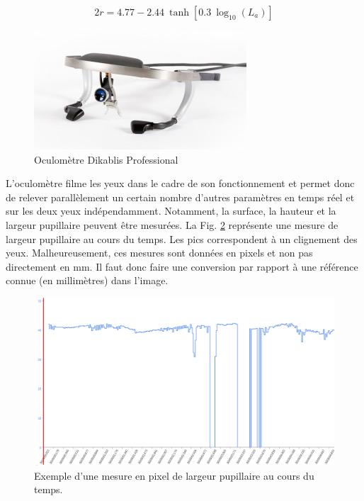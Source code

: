 	\begin{equation}
		2r = 4.77 - 2.44~\tanh[0.3~\log_{10}(L_a)]
		\label{eq:weale_equation}
	\end{equation}
	
	\begin{figure}
		\centering
		\includegraphics[scale=1]{Figures/DikablisProfessional}
		\caption{Oculomètre Dikablis Professional}
		\label{fig:dikablis_pro}
	\end{figure}
	
	\par L'oculomètre filme les yeux dans le cadre de son fonctionnement et permet donc de relever parallèlement un certain nombre d'autres paramètres en temps réel et sur les deux yeux indépendamment. Notamment, la surface, la hauteur et la largeur pupillaire peuvent être mesurées. La Fig. \ref{fig:mesure_pupille} représente une mesure de largeur pupillaire au cours du temps. Les pics correspondent à un clignement des yeux. Malheureusement, ces mesures sont données en pixels et non pas directement en mm. Il faut donc faire une conversion par rapport à une référence connue (en millimètres) dans l'image.
	
	\begin{figure}
		\centering
		\includegraphics[scale=.5]{Figures/LargeurPupillaireEnFonctionDuTemps}
		\caption{Exemple d'une mesure en pixel de largeur pupillaire au cours du temps.}
		\label{fig:mesure_pupille}
	\end{figure}
	
